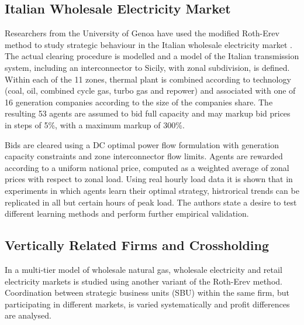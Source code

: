 \subsection{Italian Wholesale Electricity Market}
Researchers from the University of Genoa have used the modified Roth-Erev
method to study strategic behaviour in the Italian wholesale electricity market
\cite{cincotti:09}.  The actual clearing procedure is modelled and a
model of the Italian transmission system, including an interconnector to Sicily, with
zonal subdivision, is defined.  Within each of the 11 zones, thermal plant is
combined according to technology (coal, oil, combined cycle gas, turbo gas and
repower) and associated with one of 16 generation companies according to the
size of the companies share.  The resulting 53 agents are assumed to bid full
capacity and may markup bid prices in steps of 5\%, with a maximum markup of
300\%.


Bids are cleared using a DC optimal power flow formulation with
generation capacity constraints and zone interconnector flow limits.  Agents are
rewarded according to a uniform national price, computed as a weighted average
of zonal prices with respect to zonal load.  Using real hourly load data it
is shown that in experiments in which agents learn their optimal
strategy, histrorical trends can be replicated in all but certain hours of
peak load.  The authors state a desire to test different learning methods and perform
further empirical validation.

\subsection{Vertically Related Firms and Crossholding}
In \cite{micola:08} a multi-tier model of wholesale natural gas, wholesale
electricity and retail electricity markets is studied using another variant of
the Roth-Erev method.  Coordination between strategic business units (SBU)
within the same firm, but participating in different markets, is varied
systematically and profit differences are analysed.

